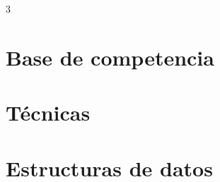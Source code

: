 \documentclass[10pt,landscape,oneside,openany,a4paper,notitlepage]{book}
\begin{document}
\clearpage
\footnotesize
\begin{multicols*}{3}
\raggedcolumns

\chapter{Base de competencia}















\chapter{T\'ecnicas}








\chapter{Estructuras de datos}
















\end{multicols*}
\end{document}
